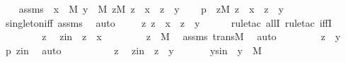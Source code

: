 \begin{isabellebody}
\ \ \isamarkupfalse%
\ assms\ {\isacharcolon}{\kern0pt}\ {\isachardoublequoteopen}x\ {\isasymin}\ M{\isachardoublequoteclose}\ {\isachardoublequoteopen}y\ {\isasymin}\ M{\isachardoublequoteclose}\ {\isachardoublequoteopen}{\isasymforall}z{\isasymin}M{\isachardot}{\kern0pt}\ z\ {\isasymin}\ x\ {\isasymlongleftrightarrow}\ z\ {\isacharequal}{\kern0pt}\ y{\isachardoublequoteclose}\isanewline
\ \ \isamarkupfalse%
\ p\ {\isacharcolon}{\kern0pt}\ {\isachardoublequoteopen}{\isasymforall}z{\isasymin}M{\isachardot}{\kern0pt}\ z\ {\isasymin}\ x\ {\isasymlongleftrightarrow}\ z\ {\isasymin}\ {\isacharbraceleft}{\kern0pt}y{\isacharbraceright}{\kern0pt}{\isachardoublequoteclose}\ \isamarkupfalse%
\ singleton{\isacharunderscore}{\kern0pt}iff\ assms\ \isamarkupfalse%
\ auto\ \isanewline
\ \ \isamarkupfalse%
\ {\isachardoublequoteopen}{\isasymforall}z{\isachardot}{\kern0pt}\ z\ {\isasymin}\ x\ {\isasymlongleftrightarrow}\ z\ {\isasymin}\ {\isacharbraceleft}{\kern0pt}y{\isacharbraceright}{\kern0pt}{\isachardoublequoteclose}\isanewline
\ \ \ \ \isamarkupfalse%
\ {\isacharparenleft}{\kern0pt}rule{\isacharunderscore}{\kern0pt}tac\ allI{\isacharsemicolon}{\kern0pt}\ rule{\isacharunderscore}{\kern0pt}tac\ iffI{\isacharparenright}{\kern0pt}\ \isanewline
\ \ \isamarkupfalse%
\ {\isacharminus}{\kern0pt}\ \isanewline
\ \ \ \ \isamarkupfalse%
\ z\ \isamarkupfalse%
\ zin\ {\isacharcolon}{\kern0pt}\ {\isachardoublequoteopen}z\ {\isasymin}\ x{\isachardoublequoteclose}\ \isanewline
\ \ \ \ \isamarkupfalse%
\ \isamarkupfalse%
\ {\isachardoublequoteopen}z\ {\isasymin}\ M{\isachardoublequoteclose}\ \isamarkupfalse%
\ assms\ transM\ \isamarkupfalse%
\ auto\ \isanewline
\ \ \ \ \isamarkupfalse%
\ \isamarkupfalse%
\ {\isachardoublequoteopen}z\ {\isasymin}\ {\isacharbraceleft}{\kern0pt}y{\isacharbraceright}{\kern0pt}{\isachardoublequoteclose}\ \isamarkupfalse%
\ p\ zin\ \isamarkupfalse%
\ auto\isanewline
\ \ \isamarkupfalse%
\ \isanewline
\ \ \ \ \isamarkupfalse%
\ z\ \isamarkupfalse%
\ zin\ {\isacharcolon}{\kern0pt}\ {\isachardoublequoteopen}z\ {\isasymin}\ {\isacharbraceleft}{\kern0pt}y{\isacharbraceright}{\kern0pt}{\isachardoublequoteclose}\ \isanewline
\ \ \ \ \isamarkupfalse%
\ ysin\ {\isacharcolon}{\kern0pt}\ {\isachardoublequoteopen}{\isacharbraceleft}{\kern0pt}y{\isacharbraceright}{\kern0pt}\ {\isasymin}\ M{\isachardoublequoteclose}\ \isamarkupfalse%

\end{isabellebody}

